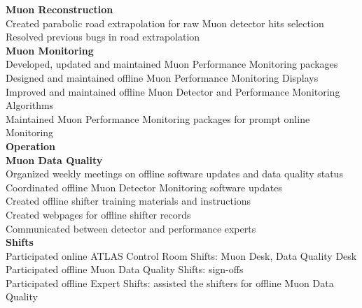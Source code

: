 \documentclass[letterpaper,11pt,oneside]{article}
\begin{document}
 	\quad \textbf{Muon Reconstruction}\\
	\quad \quad Created parabolic road extrapolation for raw Muon detector hits selection \\
	\quad \quad Resolved previous bugs in road extrapolation \\
	\vspace{0.1cm}
 	\quad \textbf{Muon Monitoring}\\
	\quad \quad Developed, updated and maintained Muon Performance Monitoring packages\\
	\quad \quad Designed and maintained offline Muon Performance Monitoring Displays \\
	\quad \quad Improved and maintained offline Muon Detector and Performance Monitoring Algorithms\\
	\quad \quad Maintained Muon Performance Monitoring packages for prompt online Monitoring \\
	\vspace{0.4cm}
 \textbf{Operation}\\
	\vspace{0.1cm}
 	\quad \textbf{Muon Data Quality}\\
	\quad \quad Organized weekly meetings on offline software updates and data quality status \\
	\quad \quad Coordinated offline Muon Detector Monitoring software updates\\
	\quad \quad Created offline shifter training materials and instructions  \\
	\quad \quad Created webpages for offline shifter records  \\
	\quad \quad Communicated between detector and performance experts  \\
	\vspace{0.1cm}
 	\quad \textbf{Shifts}\\
	\quad \quad Participated online ATLAS Control Room Shifts: Muon Desk,  Data Quality Desk \\
	\quad \quad Participated offline Muon Data Quality Shifts: sign-offs \\
	\quad \quad Participated offline Expert Shifts: assisted the shifters for offline Muon Data Quality \\
\end{document}

